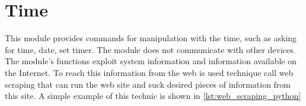 \section{Time}

This module provides commands for manipulation with the time, such as asking for time, date, set timer. The module does not communicate with other devices. The module's functions exploit system information and information available on the Internet. To reach this information from the web is used technique call web scraping that can run the web site and suck desired pieces of information from this site. A simple example of this technic is shown in \cref{lst:web_scraping_python}



